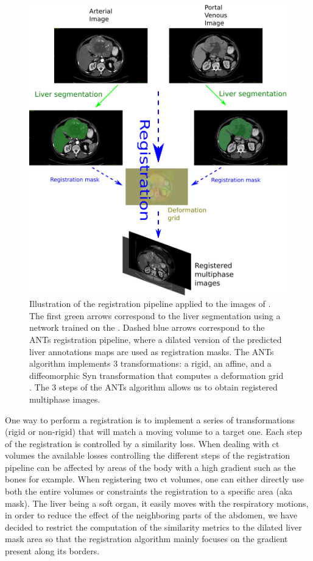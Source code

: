 \begin{figure}[th!]
\centering
\includegraphics[width=0.7\linewidth]{../HistologicalGradePrediction/images/RegistrationTCIA_pipeline_vertical2}
\caption{Illustration of the registration pipeline applied to the images of \textbf{}. The first green arrows correspond to the liver segmentation using a network trained on the \textbf{}. Dashed blue arrows correspond to the ANTs registration pipeline, where a dilated version of the predicted liver annotations maps are used as registration masks. The ANTs algorithm implements 3 transformations: a rigid, an affine, and a diffeomorphic Syn transformation that computes a deformation grid \cite{Avants2008}. The 3 steps of the ANTs algorithm allows us to obtain registered multiphase images.}
\label{fig:RegistrationTCIA_pipeline_vertical2}
\end{figure}


One way to perform a registration is to implement a series of
transformations (rigid or non-rigid) that will match a moving volume to
a target one. Each step of the registration is controlled by a
similarity loss.
When dealing with \ac{ct} volumes the available losses controlling the
different steps of the registration pipeline can be affected by areas of
the body with a high gradient such as the bones for example. When
registering two \ac{ct} volumes, one can either directly use both the entire
volumes or constraints the registration to a specific area (aka mask).
The liver being a soft organ, it easily moves with the respiratory
motions, in order to reduce the effect of the neighboring parts of the
abdomen, we have decided to restrict the computation of the similarity
metrics to the dilated liver mask area so that the registration
algorithm mainly focuses on the gradient present along its borders.

